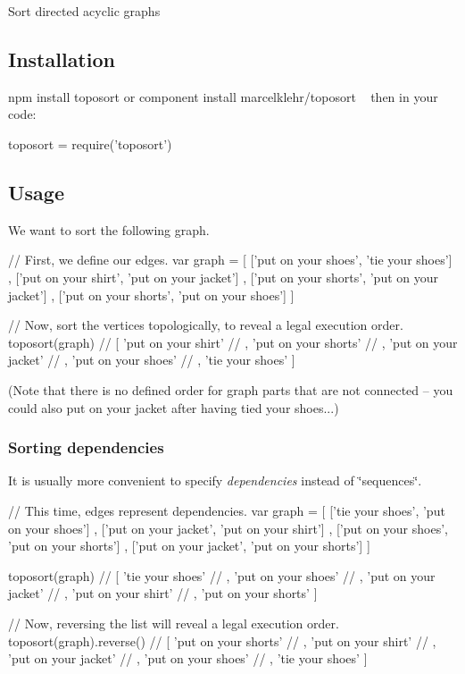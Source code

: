 Sort directed acyclic graphs

\href{https://travis-ci.org/marcelklehr/toposort}{\tt }

\subsection*{Installation}

{\ttfamily npm install toposort} or {\ttfamily component install marcelklehr/toposort} ~\newline
 then in your code\+:


\begin{DoxyCode}
toposort = require('toposort')
\end{DoxyCode}


\subsection*{Usage}

We want to sort the following graph.




\begin{DoxyCode}
// First, we define our edges.
var graph = [
  ['put on your shoes', 'tie your shoes']
, ['put on your shirt', 'put on your jacket']
, ['put on your shorts', 'put on your jacket']
, ['put on your shorts', 'put on your shoes']
]


// Now, sort the vertices topologically, to reveal a legal execution order.
toposort(graph)
// [ 'put on your shirt'
// , 'put on your shorts'
// , 'put on your jacket'
// , 'put on your shoes'
// , 'tie your shoes' ]
\end{DoxyCode}


(Note that there is no defined order for graph parts that are not connected -- you could also put on your jacket after having tied your shoes...)

\subsubsection*{Sorting dependencies}

It is usually more convenient to specify {\itshape dependencies} instead of \char`\"{}sequences\char`\"{}. 
\begin{DoxyCode}
// This time, edges represent dependencies.
var graph = [
  ['tie your shoes', 'put on your shoes']
, ['put on your jacket', 'put on your shirt']
, ['put on your shoes', 'put on your shorts']
, ['put on your jacket', 'put on your shorts']
]

toposort(graph) 
// [ 'tie your shoes'
// , 'put on your shoes'
// , 'put on your jacket'
// , 'put on your shirt'
// , 'put on your shorts' ]

// Now, reversing the list will reveal a legal execution order.
toposort(graph).reverse() 
// [ 'put on your shorts'
// , 'put on your shirt'
// , 'put on your jacket'
// , 'put on your shoes'
// , 'tie your shoes' ]
\end{DoxyCode}


